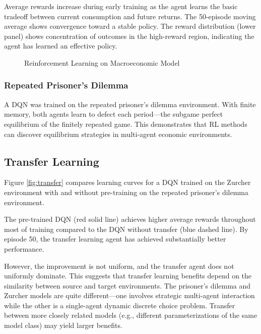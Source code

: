 \documentclass[12pt]{article}
\begin{document}
Average rewards increase during early training as the agent learns the basic tradeoff between current consumption and future returns. The 50-episode moving average shows convergence toward a stable policy. The reward distribution (lower panel) shows concentration of outcomes in the high-reward region, indicating the agent has learned an effective policy.

\begin{figure}[H]
\centering
{}
\caption{Reinforcement Learning on Macroeconomic Model}
\label{fig:rl_macro}
\end{figure}

\subsubsection{Repeated Prisoner's Dilemma}

A DQN was trained on the repeated prisoner's dilemma environment. With finite memory, both agents learn to defect each period---the subgame perfect equilibrium of the finitely repeated game. This demonstrates that RL methods can discover equilibrium strategies in multi-agent economic environments.

\subsection{Transfer Learning}

Figure \ref{fig:transfer} compares learning curves for a DQN trained on the Zurcher environment with and without pre-training on the repeated prisoner's dilemma environment.

The pre-trained DQN (red solid line) achieves higher average rewards throughout most of training compared to the DQN without transfer (blue dashed line). By episode 50, the transfer learning agent has achieved substantially better performance.

However, the improvement is not uniform, and the transfer agent does not uniformly dominate. This suggests that transfer learning benefits depend on the similarity between source and target environments. The prisoner's dilemma and Zurcher models are quite different---one involves strategic multi-agent interaction while the other is a single-agent dynamic discrete choice problem. Transfer between more closely related models (e.g., different parameterizations of the same model class) may yield larger benefits.
\end{document}
